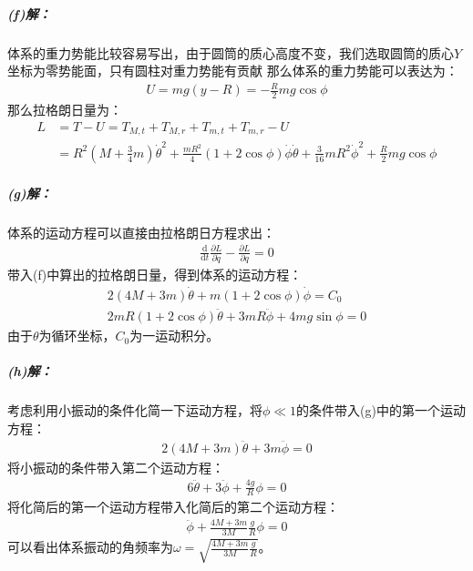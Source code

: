 \documentclass[a4paper]{ctexart}
\def\d{\mathrm{d}}
\begin{document}
    \subparagraph{(f)解：}
    体系的重力势能比较容易写出，由于圆筒的质心高度不变，我们选取圆筒的质心$Y$坐标为零势能面，只有圆柱对重力势能有贡献
    那么体系的重力势能可以表达为：
    \begin{align}
        U = mg(y - R) = -\frac{R}{2}mg\cos\phi
    \end{align}
    那么拉格朗日量为：
    \begin{align}
        L &= T - U = T_{M,t} + T_{M,r} + T_{m,t} + T_{m,r} - U\\
        & = R^{2}\left(M + \frac{3}{4}m\right)\dot{\theta}^{2} + \frac{mR^{2}}{4}(1 + 2\cos\phi)\dot{\phi}\dot{\theta} + \frac{3}{16}mR^{2}\dot{\phi}^{2} + \frac{R}{2}mg\cos\phi
    \end{align}
    \subparagraph{(g)解：}
    体系的运动方程可以直接由拉格朗日方程求出：
    \begin{align}
        \frac{\d}{\d t} \frac{\partial L}{\partial \dot{q}} - \frac{\partial L}{\partial q} = 0
    \end{align}
    带入(f)中算出的拉格朗日量，得到体系的运动方程：
    \begin{align}
        2(4M + 3m)\dot{\theta} + m(1 + 2\cos\phi)\dot{\phi} = C_{0}\\
        2mR(1 + 2\cos\phi)\ddot{\theta} + 3mR\ddot{\phi} + 4mg\sin\phi = 0
    \end{align}
    由于$\theta$为循环坐标，$C_{0}$为一运动积分。
    \subparagraph{(h)解：}
    考虑利用小振动的条件化简一下运动方程，将$\phi\ll1$的条件带入(g)中的第一个运动方程：
    \begin{align}
        2(4M + 3m)\ddot{\theta} + 3m\ddot{\phi} = 0
    \end{align}
    将小振动的条件带入第二个运动方程：
    \begin{align}
        6\ddot{\theta} + 3\ddot{\phi} + \frac{4g}{R}\phi = 0
    \end{align}
    将化简后的第一个运动方程带入化简后的第二个运动方程：
    \begin{align}
        \ddot{\phi} + \frac{4M + 3m}{3M}\frac{g}{R}\phi = 0
    \end{align}
    可以看出体系振动的角频率为$\omega = \sqrt{\frac{4M + 3m}{3M}\frac{g}{R}}$。
\end{document}
